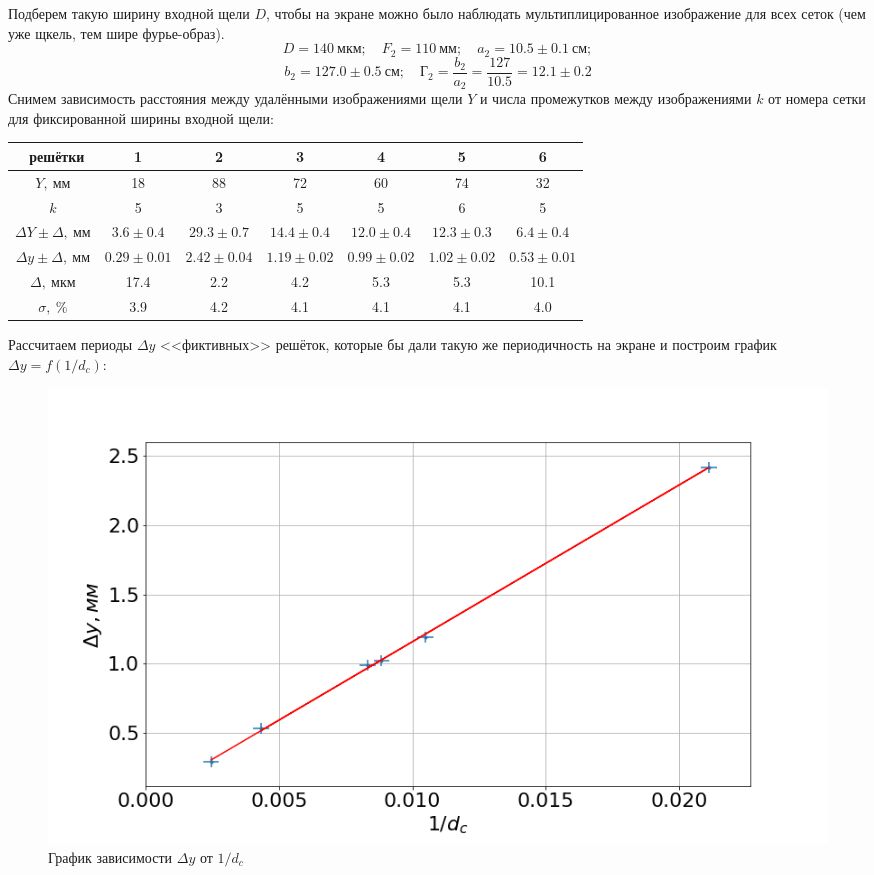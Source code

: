 \documentclass[a4paper, 12pt]{article}%
\begin{document}
Подберем такую ширину входной щели $D$, чтобы на экране можно было наблюдать мультиплицированное изображение для всех сеток (чем уже щкель, тем шире фурье-образ).
\[
D = 140\ мкм; \quad F_2 = 110\ мм; \quad a_2  = 10.5 \pm 0.1\ см; 
\]
\[
b_2 = 127.0 \pm 0.5\ см; \quad \text{Г}_2 = \frac{b_2}{a_2} = \frac{127}{10.5} = 12.1 \pm 0.2
\]
Снимем зависимость расстояния между удалёнными изображениями щели $Y$ и числа промежутков между изображениями $k$ от номера сетки для фиксированной ширины входной щели:
\begin{table}[H]
	\centering
	\begin{tabular}{|c|c|c|c|c|c|c|}  \hline
	\textnumero\ решётки & 1 & 2 & 3 & 4 & 5 & 6 \\\hline
	$Y,\ мм$ & 18 & 88 & 72 & 60 & 74 & 32 \\\hline
	$k$ & 5 & 3 & 5 & 5 & 6 & 5\\\hline
	$\Delta Y \pm \Delta,\ мм$ & $3.6 \pm 0.4$ & $29.3 \pm 0.7$ & $14.4 \pm 0.4$ & $12.0 \pm 0.4$ & $12.3 \pm 0.3$ & $6.4 \pm 0.4$ \\\hline
	
	$\Delta y \pm \Delta,\ мм$ & $0.29 \pm 0.01$ & $2.42 \pm 0.04$ & $1.19 \pm 0.02$ & $0.99 \pm 0.02$ & $1.02 \pm 0.02$ & $0.53 \pm 0.01$ \\\hline
	$\Delta,\ мкм$ & 17.4 & 2.2 & 4.2 & 5.3 & 5.3 & 10.1 \\\hline
	$\sigma,\ \%$ & 3.9 & 4.2 & 4.1 & 4.1 & 4.1 & 4.0 \\\hline
	\end{tabular}
	\end{table}
	Рассчитаем периоды $\Delta y$ <<фиктивных>> решёток, которые бы дали такую же периодичность на экране и построим график $\Delta y = f(1/ d_c)$:
	\begin{figure}[H]
	\includegraphics[width = 1.0\linewidth]{pics/g2.png}
	\caption*{График зависимости $\Delta y$ от $1 / d_c$}
\end{figure}
\end{document}
